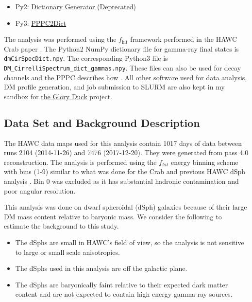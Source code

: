 \begin{itemize}
    \item Py2: \href{https://gitlab.com/hawc-observatory/sandboxes/salaza82/glory-duck-hawc/-/tree/master/GD_spectrum}{Dictionary Generator (Deprecated)}
    \item Py3: \href{https://gitlab.com/hawc-observatory/sandboxes/salaza82/pppc2dict}{PPPC2Dict}
\end{itemize}

The analysis was performed using the $f_{\textrm{hit}}$ framework performed in the HAWC Crab paper \cite{Abeysekara_2017}.
The Python2 NumPy dictionary file for gamma-ray final states is \texttt{dmCirSpecDict.npy}.
The corresponding Python3 file is \texttt{DM\_CirrelliSpectrum\_dict\_gammas.npy}.
These files can also be used for decay channels and the PPPC describes how \cite{Cirelli_2011}.
All other software used for data analysis, DM profile generation, and job submission to SLURM are also kept in my sandbox for \href{https://gitlab.com/hawc-observatory/sandboxes/salaza82/glory-duck-hawc}{the Glory Duck} project.

\subsection{Data Set and Background Description} \label{sec:gs_data_bkgd}

The HAWC data maps used for this analysis contain 1017 days of data between runs 2104 (2014-11-26) and 7476 (2017-12-20).
They were generated from pass 4.0 reconstruction.
The analysis is performed using the $f_{hit}$ energy binning scheme with bins (1-9) similar to what was done for the Crab and previous HAWC dSph analysis \cite{Abeysekara_2017,Albert_2018}.
Bin 0 was excluded as it has substantial hadronic contamination and poor angular resolution.

This analysis was done on dwarf spheroidal (dSph) galaxies because of their large DM mass content relative to baryonic mass.
We consider the following to estimate the background to this study.

\begin{itemize}
    \item The dSphs are small in HAWC's field of view, so the analysis is not sensitive to large or small scale anisotropies.
    \item The dSphs used in this analysis are off the galactic plane.
    \item The dSphs are baryonically faint relative to their expected dark matter content and are not expected to contain high energy gamma-ray sources.
\end{itemize}

